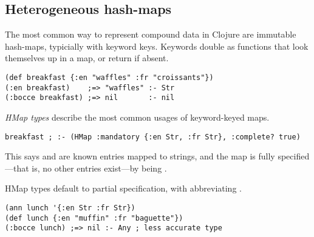 %
%
%

\subsection{Heterogeneous hash-maps}

The most common way to represent compound data in Clojure 
are immutable hash-maps, typicially with keyword keys.
%
Keywords double as functions that
look themselves up in a map, or return  if absent.
%
\begin{exmp}
\begin{lstlisting}
(def breakfast {:en "waffles" :fr "croissants"})
(:en breakfast)    ;=> "waffles" :- Str
(:bocce breakfast) ;=> nil       :- nil
\end{lstlisting}
\label{example:breakfastcomplete}
\end{exmp}

\emph{HMap types} describe the most common usages of
keyword-keyed maps.
\begin{lstlisting}
breakfast ; :- (HMap :mandatory {:en Str, :fr Str}, :complete? true)
\end{lstlisting}
This says
 and  are known entries mapped to strings,
and the map is fully specified---that is, no other entries exist---by  being .

HMap types default to partial specification, with
 abbreviating .
%
\begin{exmp}
\begin{lstlisting}
(ann lunch '{:en Str :fr Str})
(def lunch {:en "muffin" :fr "baguette"})
(:bocce lunch) ;=> nil :- Any ; less accurate type
\end{lstlisting}
\label{example:lunchpartial}
\end{exmp}

